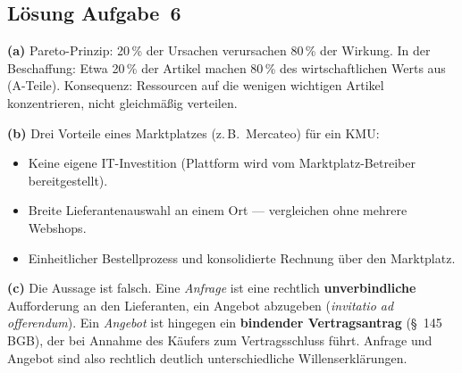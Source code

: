 \documentclass[11pt, a4paper]{article}
\begin{document}
\subsection*{Lösung Aufgabe~6}
\begin{loesung}
\textbf{(a)} Pareto-Prinzip: 20\,\% der Ursachen verursachen 80\,\% der Wirkung. In der
Beschaffung: Etwa 20\,\% der Artikel machen 80\,\% des wirtschaftlichen Werts aus
(A-Teile). Konsequenz: Ressourcen auf die wenigen wichtigen Artikel konzentrieren,
nicht gleichmäßig verteilen.

\textbf{(b)} Drei Vorteile eines Marktplatzes (z.\,B.\ Mercateo) für ein KMU:
\begin{itemize}[itemsep=0pt]
  \item Keine eigene IT-Investition (Plattform wird vom Marktplatz-Betreiber bereitgestellt).
  \item Breite Lieferantenauswahl an einem Ort --- vergleichen ohne mehrere Webshops.
  \item Einheitlicher Bestellprozess und konsolidierte Rechnung über den Marktplatz.
\end{itemize}

\textbf{(c)} Die Aussage ist falsch. Eine \emph{Anfrage} ist eine rechtlich \textbf{unverbindliche}
Aufforderung an den Lieferanten, ein Angebot abzugeben (\emph{invitatio ad offerendum}).
Ein \emph{Angebot} ist hingegen ein \textbf{bindender Vertragsantrag} (§~145 BGB), der bei
Annahme des Käufers zum Vertragsschluss führt. Anfrage und Angebot sind also rechtlich
deutlich unterschiedliche Willenserklärungen.
\end{loesung}
\end{document}
